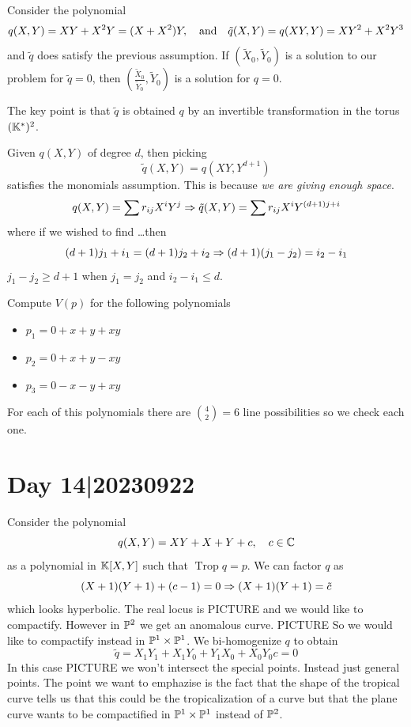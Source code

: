 \documentclass[12pt]{memoir}
\DeclareMathOperator{\Trop}{Trop}
\theoremstyle{definition}
\begin{document}
\begin{Ex}
    Consider the polynomial 
    $$q(X,Y)=XY+X^2Y=(X+X^2)Y,\quad\text{and}\quad\tilde{q}(X,Y)=q(XY,Y)=XY^2+X^2Y^3$$
    and $\tilde{q}$ does satisfy the previous assumption. If $(\tilde{X}_0,\tilde Y_0)$ is a solution to our problem for $\tilde{q}=0$, then $\left(\frac{\tilde{X}_0}{\tilde Y_0},\tilde Y_0\right)$ is a solution for $q=0$.\par 
    The key point is that $\tilde q$ is obtained $q$ by an invertible transformation in the torus $(\mathbb{K}^\ast)^2$.
\end{Ex}

\begin{ptcb}
Given $q(X,Y)$ of degree $d$, then picking 
$$\tilde{q}(X,Y)=q(XY,Y^{d+1})$$
satisfies the monomials assumption. This is because \emph{we are giving enough space}.
$$q(X,Y)=\sum r_{ij}X^iY^j\Rightarrow \tilde{q}(X,Y)=\sum r_{ij}X^iY^{(d+1)j+i}$$
where if we wished to find \dots then 
$$(d+1)j_1+i_1=(d+1)j_2+i_2\Rightarrow (d+1)(j_1-j_2)=i_2-i_1$$
$j_1-j_2\geq d+1$ when $j_1=j_2$ and $i_2-i_1\leq d$.
\end{ptcb}

\begin{Ex}
    Compute $V(p)$ for the following polynomials
    \begin{itemize}
        \item $p_1=0+x+y+xy$
        \item $p_2=0+x+y-xy$
        \item $p_3=0-x-y+xy$
    \end{itemize}
    For each of this polynomials there are $\binom{4}{2}=6$ line possibilities so we check each one.
\end{Ex}

\section{Day 14|20230922}

Consider the polynomial 
$$q(X,Y)=XY+X+Y+c,\quad c\in\mathbb{C}$$
as a polynomial in $\mathbb{K}[X,Y]$ such that $\Trop q=p$. We can factor $q$ as 
$$(X+1)(Y+1)+(c-1)=0\Rightarrow(X+1)(Y+1)=\tilde{c}$$
which looks hyperbolic. The real locus is PICTURE and we would like to compactify. However in $\mathbb{P}^2$ we get an anomalous curve. PICTURE So we would like to compactify instead in $\mathbb{P}^1\times\mathbb{P}^1$.  We bi-homogenize $q$ to obtain 
$$\tilde{q}=X_1Y_1+X_1Y_0+Y_1X_0+X_0Y_0c=0$$ 
In this case PICTURE we won't intersect the special points. Instead just general points. The point we want to emphazise is the fact that the shape of the tropical curve tells us that this could be the tropicalization of  a curve but that the plane curve wants to be compactified in $\mathbb{P}^1\times\mathbb{P}^1$ instead of $\mathbb{P}^2$.
\end{document}
